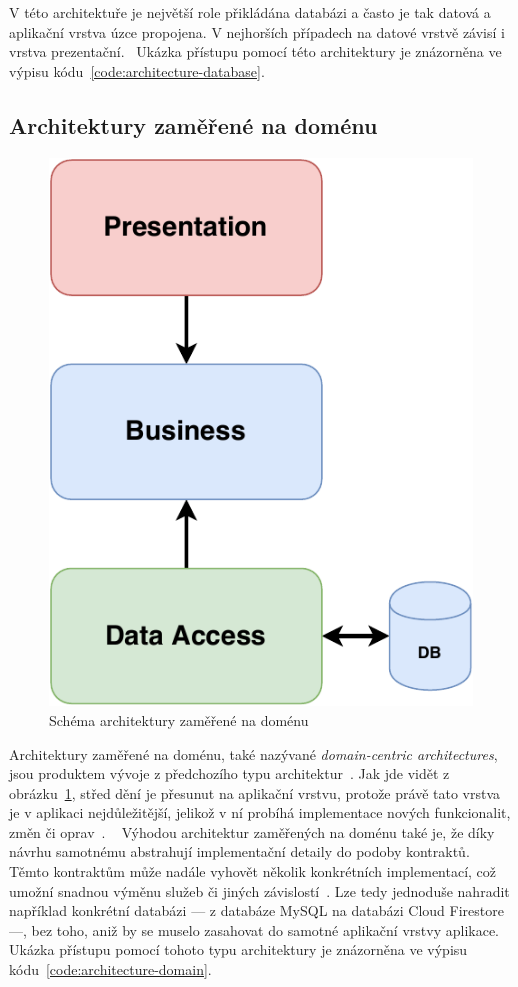 V této architektuře je největší role přikládána databázi
a často je tak datová a aplikační vrstva úzce propojena.
V nejhorších případech na datové vrstvě závisí i
vrstva prezentační.~\cite{architecture}
Ukázka přístupu pomocí této architektury je znázorněna ve výpisu
kódu~\ref{code:architecture-database}.

\subsection{Architektury zaměřené na doménu}

\begin{figure}
    \centering
    \includegraphics[width=0.35\linewidth]{assets/technology-research/architecture/domain-centric.pdf}
    \caption{Schéma architektury zaměřené na doménu~\cite{architecture}}
    \label{fig:architecture_domain}
\end{figure}

Architektury zaměřené na doménu,
také nazývané \emph{domain-centric architectures},
jsou produktem vývoje z předchozího typu architektur~\cite{architecture}.
Jak jde vidět z obrázku~\ref{fig:architecture_domain},
střed dění je přesunut na aplikační vrstvu,
protože právě tato vrstva je v aplikaci nejdůležitější,
jelikož v ní probíhá implementace nových funkcionalit,
změn či oprav~\cite{architecture}.
\emph{}~\cite[strana~140]{martin_clean_architecture}
Výhodou architektur zaměřených na doménu také je,
že díky návrhu samotnému abstrahují implementační detaily do podoby kontraktů.
Těmto kontraktům může nadále vyhovět několik konkrétních implementací,
což umožní snadnou výměnu služeb
či jiných závislostí~\cite[strana~135--146]{martin_clean_architecture}.
Lze tedy jednoduše nahradit například konkrétní databázi
--- z databáze MySQL na databázi Cloud Firestore ---,
bez toho,
aniž by se muselo zasahovat do samotné aplikační vrstvy aplikace.
Ukázka přístupu pomocí tohoto typu architektury je znázorněna
ve výpisu kódu~\ref{code:architecture-domain}.

